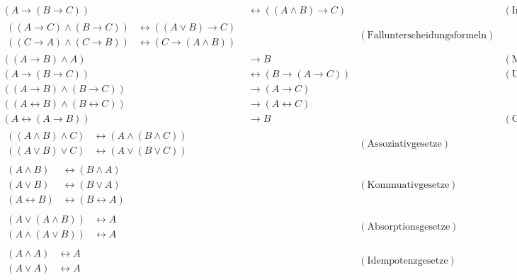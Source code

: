 \documentclass[12pt,BCOR1cm,ngerman,DIV15,fleqn,chapterprefix,headings=small]{ST1-book}
\begin{document}
\begin{align*}
(A \to (B \to C)) & \leftrightarrow ((A \land B) \to C) && (\text{Import-/Exportformel}) \\[1em]
    \begin{split} ((A\to C) \land (B\to C)) & \leftrightarrow ((A\lor B) \to C) \\
    ((C\to A) \land (C\to B)) & \leftrightarrow (C\to (A\land B))
    \end{split} && (\text{Fallunterscheidungsformeln}) \\[1em]
    ((A\to B) \land A) & \to B && (\text{Modus-ponens-Formel}) \\[1em]
   (A \to (B \to C)) & \leftrightarrow (B \to (A \to C))  && ( \text{Umordnung der Prämissen}) \\[1em]
    ((A \to B) \land (B \to C)) & \to (A \to C) && \\ %
 ((A\leftrightarrow B)\land (B\leftrightarrow C)) & \to (A\leftrightarrow C) \\[1em]
    (A\leftrightarrow (A\to B)) & \to B && (\text{Curry-Paradoxon}) \\[1em]
  \begin{split} ((A \land B) \land C) & \leftrightarrow (A \land (B \land C)) \\
  ((A \lor B) \lor C) & \leftrightarrow (A \lor (B \lor C)) \end{split} && (\text{Assoziativgesetze}) \\[1em]
  \begin{split} (A \land B) & \leftrightarrow (B \land A) \\
  (A \lor B) & \leftrightarrow (B \lor A) \\
  (A\leftrightarrow B) & \leftrightarrow (B \leftrightarrow A) \end{split} && ( \text{Kommuativgesetze}) \\[1em]
    \begin{split} (A \lor (A \land B)) & \leftrightarrow A \\
  (A \land (A \lor B)) & \leftrightarrow A \end{split} && ( \text{Absorptionsgesetze}) \\[1em]
  \begin{split}
   (A \land A) & \leftrightarrow A \\
   (A \lor A) & \leftrightarrow A
  \end{split} && (\text{Idempotenzgesetze}) \\[1em]

\end{align*}
\end{document}
